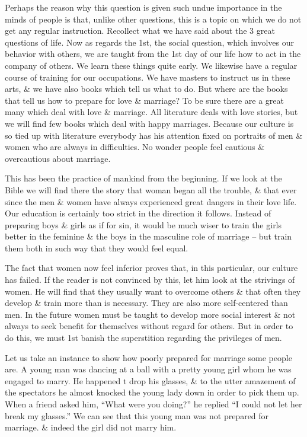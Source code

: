 \documentclass{article}
\begin{document}
Perhaps the reason why this question is given such undue importance in the minds of people is that, unlike other questions, this is a topic on which we do not get any regular instruction. Recollect what we have said about the 3 great questions of life. Now as regards the 1st, the social question, which involves our behavior with others, we are taught from the 1st day of our life how to act in the company of others. We learn these things quite early. We likewise have a regular course of training for our occupations. We have masters to instruct us in these arts, \& we have also books which tell us what to do. But where are the books that tell us how to prepare for love \& marriage? To be sure there are a great many which deal with love \& marriage. All literature deals with love stories, but we will find few books which deal with happy marriages. Because our culture is so tied up with literature everybody has his attention fixed on portraits of men \& women who are always in difficulties. No wonder people feel cautious \& overcautious about marriage.

This has been the practice of mankind from the beginning. If we look at the Bible we will find there the story that woman began all the trouble, \& that ever since the men \& women have always experienced great dangers in their love life. Our education is certainly too strict in the direction it follows. Instead of preparing boys \& girls as if for sin, it would be much wiser to train the girls better in the feminine \& the boys in the masculine role of marriage -- but train them both in such way that they would feel equal.

The fact that women now feel inferior proves that, in this particular, our culture has failed. If the reader is not convinced by this, let him look at the strivings of women. He will find that they usually want to overcome others \& that often they develop \& train more than is necessary. They are also more self-centered than men. In the future women must be taught to develop more social interest \& not always to seek benefit for themselves without regard for others. But in order to do this, we must 1st banish the superstition regarding the privileges of men.

Let us take an instance to show how poorly prepared for marriage some people are. A young man was dancing at a ball with a pretty young girl whom he was engaged to marry. He happened t drop his glasses, \& to the utter amazement of the spectators he almost knocked the young lady down in order to pick them up. When a friend asked him, ``What were you doing?'' he replied ``I could not let her break my glasses.'' We can see that this young man was not prepared for marriage. \& indeed the girl did not marry him.
\end{document}
